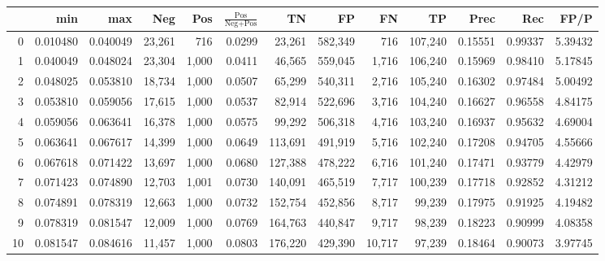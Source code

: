 \begin{tabular}{rrrrrrrrrrrrr}
\toprule
{} &       min &       max &     Neg &    Pos & $\frac{\text{Pos}}{\text{Neg}+\text{Pos}}$ &       TN &       FP &       FN &       TP &     Prec &      Rec &     FP/P \\
\midrule
0   &  0.010480 &  0.040049 &  23,261 &    716 &                                     0.0299 &   23,261 &  582,349 &      716 &  107,240 &  0.15551 &  0.99337 &  5.39432 \\
1   &  0.040049 &  0.048024 &  23,304 &  1,000 &                                     0.0411 &   46,565 &  559,045 &    1,716 &  106,240 &  0.15969 &  0.98410 &  5.17845 \\
2   &  0.048025 &  0.053810 &  18,734 &  1,000 &                                     0.0507 &   65,299 &  540,311 &    2,716 &  105,240 &  0.16302 &  0.97484 &  5.00492 \\
3   &  0.053810 &  0.059056 &  17,615 &  1,000 &                                     0.0537 &   82,914 &  522,696 &    3,716 &  104,240 &  0.16627 &  0.96558 &  4.84175 \\
4   &  0.059056 &  0.063641 &  16,378 &  1,000 &                                     0.0575 &   99,292 &  506,318 &    4,716 &  103,240 &  0.16937 &  0.95632 &  4.69004 \\
5   &  0.063641 &  0.067617 &  14,399 &  1,000 &                                     0.0649 &  113,691 &  491,919 &    5,716 &  102,240 &  0.17208 &  0.94705 &  4.55666 \\
6   &  0.067618 &  0.071422 &  13,697 &  1,000 &                                     0.0680 &  127,388 &  478,222 &    6,716 &  101,240 &  0.17471 &  0.93779 &  4.42979 \\
7   &  0.071423 &  0.074890 &  12,703 &  1,001 &                                     0.0730 &  140,091 &  465,519 &    7,717 &  100,239 &  0.17718 &  0.92852 &  4.31212 \\
8   &  0.074891 &  0.078319 &  12,663 &  1,000 &                                     0.0732 &  152,754 &  452,856 &    8,717 &   99,239 &  0.17975 &  0.91925 &  4.19482 \\
9   &  0.078319 &  0.081547 &  12,009 &  1,000 &                                     0.0769 &  164,763 &  440,847 &    9,717 &   98,239 &  0.18223 &  0.90999 &  4.08358 \\
10  &  0.081547 &  0.084616 &  11,457 &  1,000 &                                     0.0803 &  176,220 &  429,390 &   10,717 &   97,239 &  0.18464 &  0.90073 &  3.97745 \\

\end{tabular}
